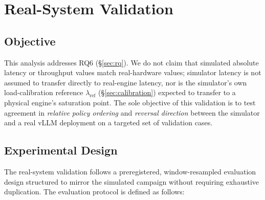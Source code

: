 \section{Real-System Validation}
\label{sec:real-system}

\subsection{Objective}
\label{sec:real-system-objective}

This analysis addresses RQ6 (\S\ref{sec:rq}). We do not claim that simulated absolute latency or throughput values match real-hardware values; simulator latency is not assumed to transfer directly to real-engine latency, nor is the simulator's own load-calibration reference $\lambda_{\mathrm{ref}}$ (\S\ref{sec:calibration}) expected to transfer to a physical engine's saturation point. The sole objective of this validation is to test agreement in \emph{relative policy ordering} and \emph{reversal direction} between the simulator and a real vLLM deployment on a targeted set of validation cases.

\subsection{Experimental Design}
\label{sec:real-system-design}

The real-system validation follows a preregistered, window-resampled evaluation design structured to mirror the simulated campaign without requiring exhaustive duplication. The evaluation protocol is defined as follows:

